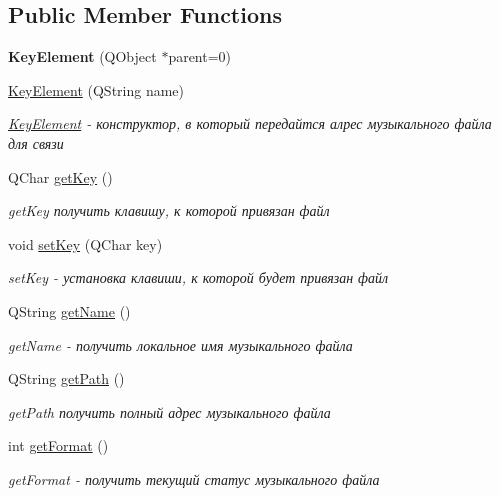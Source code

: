 \subsection*{Public Member Functions}
\begin{DoxyCompactItemize}
\item 
\mbox{\label{class_key_element_a633b887fb11d894f467f4ab75eca4c06}} 
{\bfseries Key\+Element} (Q\+Object $\ast$parent=0)
\item 
\hyperlink{class_key_element_aee0ae2b886fdc51944e3ea51d5f78162}{Key\+Element} (Q\+String name)
\begin{DoxyCompactList}\small\item\em \hyperlink{class_key_element}{Key\+Element} -\/ конструктор, в который передайтся алрес музыкального файла для связи \end{DoxyCompactList}\item 
Q\+Char \hyperlink{class_key_element_a6e0591a132b0b7c56196393552e7facd}{get\+Key} ()
\begin{DoxyCompactList}\small\item\em get\+Key получить клавишу, к которой привязан файл \end{DoxyCompactList}\item 
void \hyperlink{class_key_element_a19d376b834c91498ac136cf39ee31b5d}{set\+Key} (Q\+Char key)
\begin{DoxyCompactList}\small\item\em set\+Key -\/ установка клавиши, к которой будет привязан файл \end{DoxyCompactList}\item 
Q\+String \hyperlink{class_key_element_a30701d7ff9a6ab3ec4ac69c0487f462c}{get\+Name} ()
\begin{DoxyCompactList}\small\item\em get\+Name -\/ получить локальное имя музыкального файла \end{DoxyCompactList}\item 
Q\+String \hyperlink{class_key_element_a04460e1dedb060dd7c21a7a4ef3a3ee2}{get\+Path} ()
\begin{DoxyCompactList}\small\item\em get\+Path получить полный адрес музыкального файла \end{DoxyCompactList}\item 
int \hyperlink{class_key_element_ab9a05ec48e81319c0f9648535bf448ef}{get\+Format} ()
\begin{DoxyCompactList}\small\item\em get\+Format -\/ получить текущий статус музыкального файла \end{DoxyCompactList}\item 

\end{DoxyCompactItemize}
